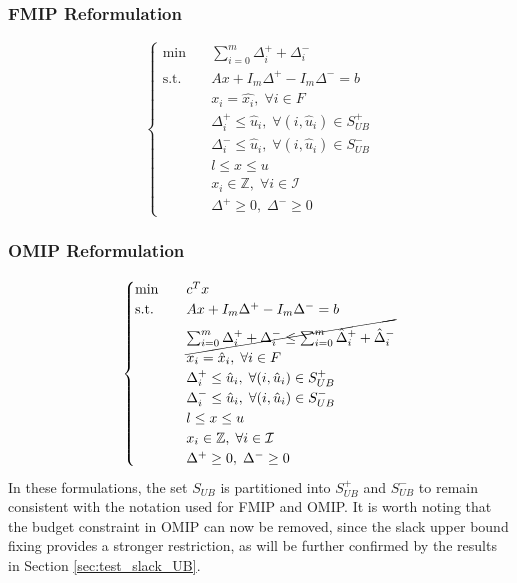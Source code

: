 \subsubsection{FMIP Reformulation}
\begin{equation}
\begin{cases}
\text{min} \quad & \sum_{i=0}^m \Delta_i^{+}+\Delta_i^{-} \\ 
\text{s.t.} \quad & Ax + I_m\Delta^+ - I_m\Delta^- = b\\ 
& x_i = \hat{x_i}, \; \forall i \in F\\ 
& \Delta^+_i \le \hat{u}_i, \; \forall (i,\hat{u}_i) \in S_{UB}^+\\
& \Delta^-_i \le \hat{u}_i, \; \forall (i,\hat{u}_i) \in S_{UB}^-\\  
& l \le x \le u\\ 
& x_i \in \mathbb{Z}, \; \forall i \in \mathcal{I} \\ 
& \Delta^+ \ge 0, \; \Delta^- \ge 0
\end{cases}
\end{equation}

\subsubsection{OMIP Reformulation}
\begin{equation}
\begin{cases}
\text{min} \quad & c^T x \\ 
\text{s.t.} \quad & Ax + I_m\Delta^+ - I_m\Delta^- = b\\
& \cancel{\sum_{i=0}^m \Delta_i^{+}+\Delta_i^{-} \le \sum_{i=0}^m \hat\Delta_i^{+}+\hat\Delta_i^{-}}\\ 
& x_i = \hat{x}_i, \; \forall i \in F\\ 
& \Delta^+_i \le \hat{u}_i, \; \forall (i,\hat{u}_i) \in S_{UB}^+\\
& \Delta^-_i \le \hat{u}_i, \; \forall (i,\hat{u}_i) \in S_{UB}^-\\  
& l \le x \le u\\ 
& x_i \in \mathbb{Z}, \; \forall i \in \mathcal{I} \\ 
& \Delta^+ \ge 0, \; \Delta^- \ge 0 
\end{cases}
\end{equation}
In these formulations, the set $S_{UB}$ is partitioned into $S_{UB}^+$ and $S_{UB}^-$ to remain consistent with the notation used for FMIP and OMIP.  
It is worth noting that the budget constraint in OMIP can now be removed, since the slack upper bound fixing provides a stronger restriction, as will be further confirmed by the results in Section \ref{sec:test_slack_UB}.  

